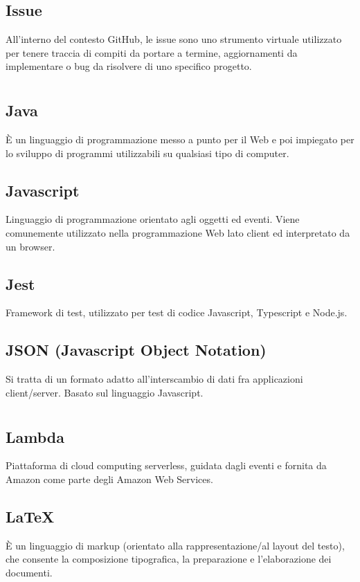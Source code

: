 	\subsection*{Issue}
	All'interno del contesto GitHub, le issue sono uno strumento virtuale utilizzato per tenere traccia di compiti da portare a termine, aggiornamenti da implementare o bug da risolvere di uno specifico progetto.
\pagebreak
\section[J]{}
	\subsection*{Java}
	È un linguaggio di programmazione messo a punto per il Web e poi impiegato per lo sviluppo di programmi utilizzabili su qualsiasi tipo di computer.
	\subsection*{Javascript}
	Linguaggio di programmazione orientato agli oggetti ed eventi. Viene comunemente utilizzato nella programmazione Web lato client ed interpretato da un browser.
	\subsection*{Jest}
	Framework di test, utilizzato per test di codice Javascript, Typescript e Node.js. 
	\subsection*{JSON (Javascript Object Notation)}
	Si tratta di un formato adatto all’interscambio di dati fra applicazioni client/server. Basato sul linguaggio Javascript. 
\pagebreak
\section[L]{}
	\subsection*{Lambda}
	Piattaforma di cloud computing serverless, guidata dagli eventi e fornita da Amazon come parte degli Amazon Web Services.
	\subsection*{\LaTeX{}}
	È un linguaggio di markup (orientato alla rappresentazione/al layout del testo), che consente la composizione tipografica, la preparazione e l'elaborazione dei documenti.
